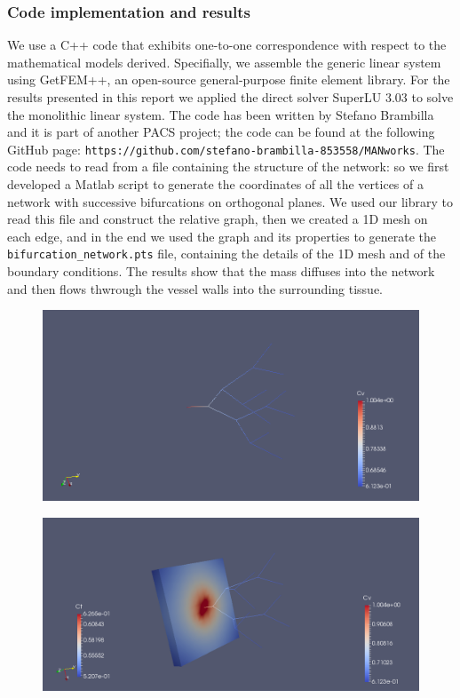 \documentclass[10pt]{article} %
\begin{document}
	\subsubsection{Code implementation and results}
	We use a C++ code that exhibits one-to-one correspondence with respect to the
	mathematical models derived. Specifially, we assemble the generic linear
	system using GetFEM++, an open-source general-purpose finite element library. For the results presented in this report we applied the direct solver SuperLU 3.03 to solve the monolithic linear system.
	The code has been written by Stefano Brambilla and it is part of another PACS project; the code can be found at the following GitHub page: \texttt{https://github.com/stefano-brambilla-853558/MANworks}.
	\newline\newline
	The code needs to read from a file containing the structure of the network: so we first developed a Matlab script to generate the coordinates of all the vertices of a network with successive bifurcations on orthogonal planes. We used our library to read this file and construct the relative graph, then we created a 1D mesh on each edge, and in the end we used the graph and its properties to generate the \texttt{bifurcation\_network.pts} file, containing the details of the 1D mesh and of the boundary conditions.
	\newline
	The results show that the mass diffuses into the network and then flows thwrough the vessel walls into the surrounding tissue.
	
	\begin{figure}[h]
		\centering
		\includegraphics[width=0.85\linewidth]{cv}
		\label{fig:cv}
	\end{figure}
	
	\begin{figure}[!h]
		\centering
		\includegraphics[width=0.85\linewidth]{ct1}
		\label{fig:ct1}
	\end{figure}
	
\end{document}
